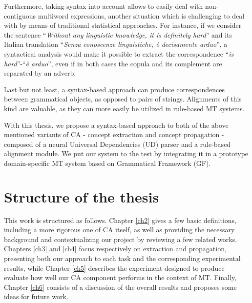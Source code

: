 Furthermore, taking syntax into account allows to easily deal with non-contiguous multiword expressions, another situation which is challenging to deal with by means of traditional statistical approaches. For instance, if we consider the sentence ``\textit{Without any linguistic knowledge, it is definitely hard}'' and its Italian translation ``\textit{Senza conoscenze linguistiche, è decisamente arduo}'', a syntactical analysis would make it possible to extract the correspondence ``\textit{is hard}''-``\textit{è arduo}'', even if in both cases the copula and its complement are separated by an adverb. \smallskip

Last but not least, a syntax-based approach can produce correspondences between grammatical objects, as opposed to pairs of strings. Alignments of this kind are valuable, as they can more easily be utilized in rule-based MT systems. \smallskip

With this thesis, we propose a syntax-based approach to both of the above mentioned variants of CA - concept extraction and concept propagation - composed of a neural Universal Dependencies (UD) parser and a rule-based alignment module.
We put our system to the test by integrating it in a prototype domain-specific MT system based on Grammatical Framework (GF).

\section*{Structure of the thesis}
This work is structured as follows. 
Chapter \ref{ch2} gives a few basic definitions, including a more rigorous one of CA itself, as well as providing the necessary background and contextualizing our project by reviewing a few related works. 
Chapters \ref{ch3} and \ref{ch4} focus respectively on extraction and propagation, presenting both our approach to each task and the corresponding experimental results, while Chapter \ref{ch5} describes the experiment designed to produce evaluate how well our CA component performs in the context of MT. 
Finally, Chapter \ref{ch6} consists of a discussion of the overall results and proposes some ideas for future work.